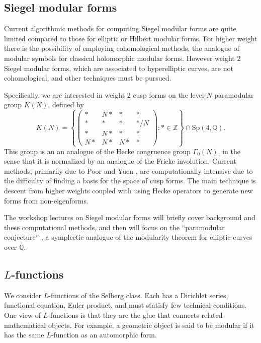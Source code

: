\documentclass[12pt]{amsart}
\numberwithin{equation}{section}
\newcommand{\Q}{\mathbb Q}
\newcommand{\Z}{\mathbb Z}
\begin{document}
\subsection{Siegel modular forms}

Current algorithmic methods for computing Siegel modular forms are
quite limited compared to those for elliptic or Hilbert modular forms.
For higher weight there is the possibility of employing cohomological
methods, the analogue of modular symbols for classical holomorphic
modular forms.  However weight 2 Siegel modular forms, which are associated to
hyperelliptic curves, are not cohomological, and other techniques must
be pursued.  

Specifically, we are interested in weight 2 cusp forms on the
level-$N$ paramodular group $K (N)$, defined by
$$
K(N)=\left\{
\left(\begin{matrix}
  * & N* & * &*\\
* & * & * & */N\\
* & N* &*&*\\
N*&N*&N*&*
\end{matrix}\right)
:
*\in{\Z}\right\}\cap \mathrm{Sp}(4, \Q).
$$
This group is an an analogue of the Hecke congruence group
$\Gamma_0(N)$, in the sense that it is normalized by an analogue of
the Fricke involution.  Current methods, primarily due to Poor and
Yuen \cite{poory, PY_para_p}, are computationally intensive due to the
difficulty of finding a basis for the space of cusp forms.  The main
technique is descent from higher weights coupled with using Hecke
operators to generate new forms from non-eigenforms. 

The workshop lectures on Siegel modular forms will briefly cover
background and these computational methods, and then will focus on the
``paramodular conjecture'' \cite{BrumerKramer}, a symplectic analogue
of the modularity theorem for elliptic curves over $\Q$.


\subsection{$L$-functions}

We consider $L$-functions of the Selberg class.
Each has a Dirichlet series, functional equation, 
Euler product, and must statisfy few technical conditions.  One view of
$L$-functions is that they are the glue that connects related
mathematical objects.  For example, a geometric object is said to be
modular if it has the same $L$-function as an automorphic form.
\end{document}

